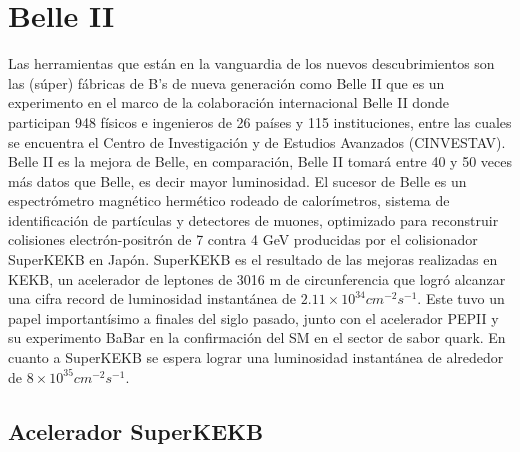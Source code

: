 \chapter{Belle II}

Las herramientas que están en la vanguardia de los nuevos descubrimientos son las (súper) fábricas de B's de nueva generación como Belle II que es un experimento en el marco de la colaboración internacional Belle II donde participan  948 físicos e ingenieros de 26 países y 115 instituciones, entre las cuales se encuentra el Centro de Investigación y de Estudios Avanzados (CINVESTAV). Belle II es la mejora de Belle, en comparación, Belle II tomará entre 40 y 50 veces más datos que Belle, es decir mayor luminosidad. El sucesor de Belle es un espectrómetro magnético hermético rodeado de calorímetros, sistema de identificación de partículas y detectores de muones, optimizado para reconstruir colisiones electrón-positrón de 7 contra 4 GeV producidas por el colisionador SuperKEKB en Japón. SuperKEKB es el resultado de las mejoras realizadas en KEKB, un acelerador de leptones de 3016 m de circunferencia que logró alcanzar una cifra record de luminosidad instantánea de \(2.11\times10^{34}cm^{-2}s^{-1}\). Este tuvo un papel importantísimo a finales del siglo pasado, junto con el acelerador PEPII y su experimento BaBar en la confirmación del SM en el sector de sabor quark. En cuanto a SuperKEKB se espera lograr una luminosidad instantánea de alrededor de \(8\times10^{35}cm^{-2}s^{-1}\).

\section{Acelerador SuperKEKB}

